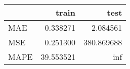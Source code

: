 \begin{tabular}{lrr}
\toprule
{} &      train &        test \\
\midrule
MAE  &   0.338271 &    2.084561 \\
MSE  &   0.251300 &  380.869688 \\
MAPE &  39.553521 &         inf \\
\bottomrule
\end{tabular}
